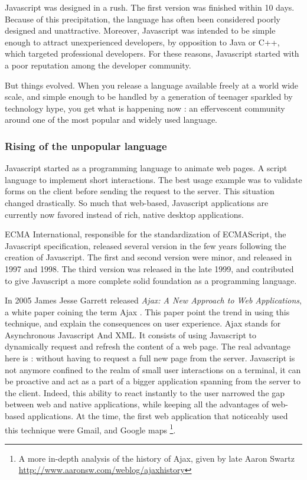 Javascript was designed in a rush. The first version was finished within 10 days.
Because of this precipitation, the language has often been considered poorly designed and unattractive.
Moreover, Javascript was intended to be simple enough to attract unexperienced developers, by opposition to Java or C++, which targeted professional developers.
For these reasons, Javascript started with a poor reputation among the developer community.

But things evolved.
When you release a language available freely at a world wide scale, and simple enough to be handled by a generation of teenager sparkled by technology hype, you get what is happening now : an effervescent community around one of the most popular and widely used language.

\subsubsection{Rising of the unpopular language}

Javascript started as a programming language to animate web pages.
A script language to implement short interactions.
The best usage example was to validate forms on the client before sending the request to the server.
This situation changed drastically.
So much that web-based, Javascript applications are currently now favored instead of rich, native desktop applications.

ECMA International, responsible for the standardization of ECMAScript, the Javascript specification, released several version in the few years following the creation of Javascript.
The first and second version were minor, and released in 1997 and 1998.
The third version was released in the late 1999, and contributed to give Javascript a more complete solid foundation as a programming language.

In 2005 James Jesse Garrett released \textit{Ajax: A New Approach to Web Applications}, a white paper coining the term Ajax \cite{Garrett2005}.
This paper point the trend in using this technique, and explain the consequences on user experience.
Ajax stands for Asynchronous Javascript And XML.
It consists of using Javascript to dynamically request and refresh the content of a web page.
The real advantage here is : without having to request a full new page from the server.
Javascript is not anymore confined to the realm of small user interactions on a terminal, it can be proactive and act as a part of a bigger application spanning from the server to the client.
Indeed, this ability to react instantly to the user narrowed the gap between web and native applications, while keeping all the advantages of web-based applications.
At the time, the first web application that noticeably used this technique were Gmail, and Google maps \footnote{A more in-depth analysis of the history of Ajax, given by late Aaron Swartz \url{http://www.aaronsw.com/weblog/ajaxhistory}}.

